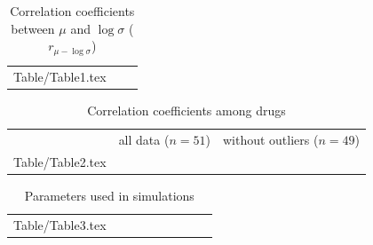\documentclass[a4paper,11pt]{article}
\makeatletter
\newcommand*\ExpandableInput[1]{\@@input#1 }
\makeatother
\begin{document}
\clearpage


\begin{table}[htbp]
 \caption{Correlation coefficients between $\mu$ and $\log \sigma$ ($r_{\mu - \log \sigma}$)}
 \label{tbl1}
 \small
 \vspace{1ex}
 \centering
 \begin{tabular}{ccc}
  \toprule
  \ExpandableInput{Table/Table1.tex}
 \end{tabular}
\end{table}


\begin{table}[htbp]
 \caption{Correlation coefficients among drugs}
 \label{tbl2}
 \small
 \vspace{1ex}
 \centering
 \begin{tabular}{ccccc}
  \toprule
   & \multicolumn{2}{c}{all data ($n = 51$)}
   & \multicolumn{2}{c}{without outliers ($n = 49$)} \\
  \cmidrule(lr){2-3}
  \cmidrule(lr){4-5}
  \ExpandableInput{Table/Table2.tex}
 \end{tabular}
\end{table}



\begin{table}[htbp]
 \caption{Parameters used in simulations}
 \label{tbl3}
 \small
 \vspace{1ex}
 \centering
 \begin{tabular}{ccccccccc}
  \toprule
  \ExpandableInput{Table/Table3.tex}
 \end{tabular}
\end{table}

\clearpage
\end{document}
